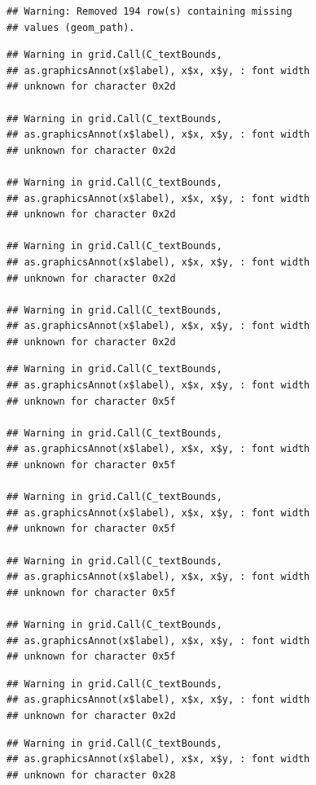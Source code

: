 \documentclass[
]{book}
\begin{document}
\begin{verbatim}
## Warning: Removed 194 row(s) containing missing
## values (geom_path).
\end{verbatim}

\begin{verbatim}
## Warning in grid.Call(C_textBounds,
## as.graphicsAnnot(x$label), x$x, x$y, : font width
## unknown for character 0x2d

## Warning in grid.Call(C_textBounds,
## as.graphicsAnnot(x$label), x$x, x$y, : font width
## unknown for character 0x2d

## Warning in grid.Call(C_textBounds,
## as.graphicsAnnot(x$label), x$x, x$y, : font width
## unknown for character 0x2d

## Warning in grid.Call(C_textBounds,
## as.graphicsAnnot(x$label), x$x, x$y, : font width
## unknown for character 0x2d

## Warning in grid.Call(C_textBounds,
## as.graphicsAnnot(x$label), x$x, x$y, : font width
## unknown for character 0x2d
\end{verbatim}

\begin{verbatim}
## Warning in grid.Call(C_textBounds,
## as.graphicsAnnot(x$label), x$x, x$y, : font width
## unknown for character 0x5f

## Warning in grid.Call(C_textBounds,
## as.graphicsAnnot(x$label), x$x, x$y, : font width
## unknown for character 0x5f

## Warning in grid.Call(C_textBounds,
## as.graphicsAnnot(x$label), x$x, x$y, : font width
## unknown for character 0x5f

## Warning in grid.Call(C_textBounds,
## as.graphicsAnnot(x$label), x$x, x$y, : font width
## unknown for character 0x5f

## Warning in grid.Call(C_textBounds,
## as.graphicsAnnot(x$label), x$x, x$y, : font width
## unknown for character 0x5f
\end{verbatim}

\begin{verbatim}
## Warning in grid.Call(C_textBounds,
## as.graphicsAnnot(x$label), x$x, x$y, : font width
## unknown for character 0x2d
\end{verbatim}

\begin{verbatim}
## Warning in grid.Call(C_textBounds,
## as.graphicsAnnot(x$label), x$x, x$y, : font width
## unknown for character 0x28
\end{verbatim}
\end{document}
